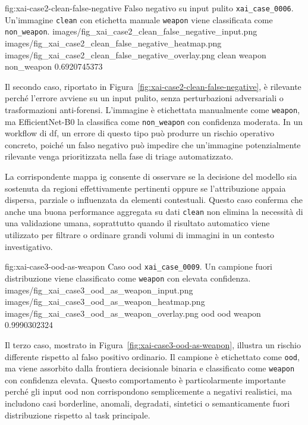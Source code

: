 \XAIcaseFigure
{fig:xai-case2-clean-false-negative}
{Falso negativo su input pulito \texttt{xai\_case\_0006}. Un'immagine \texttt{clean} con etichetta manuale \texttt{weapon} viene classificata come \texttt{non\_weapon}.}
{images/fig_xai_case2_clean_false_negative_input.png}
{images/fig_xai_case2_clean_false_negative_heatmap.png}
{images/fig_xai_case2_clean_false_negative_overlay.png}
{clean}
{weapon}
{non\_weapon}
{0.6920745373}

Il secondo caso, riportato in Figura~\ref{fig:xai-case2-clean-false-negative},
è rilevante perché l'errore avviene su un input pulito, senza perturbazioni
adversariali o trasformazioni anti-forensi. L'immagine è etichettata
manualmente come \texttt{weapon}, ma EfficientNet-B0 la classifica come
\texttt{non\_weapon} con confidenza moderata. In un workflow di \gls{df}, un
errore di questo tipo può produrre un rischio operativo concreto, poiché un falso
negativo può impedire che un'immagine potenzialmente rilevante venga
prioritizzata nella fase di triage automatizzato.

La corrispondente mappa \gls{ig} consente di osservare se la decisione del
modello sia sostenuta da regioni effettivamente pertinenti oppure se
l'attribuzione appaia dispersa, parziale o influenzata da elementi contestuali.
Questo caso conferma che anche una buona performance aggregata su dati
\texttt{clean} non elimina la necessità di una validazione umana, soprattutto
quando il risultato automatico viene utilizzato per filtrare o ordinare grandi
volumi di immagini in un contesto investigativo.

\XAIcaseFigure
{fig:xai-case3-ood-as-weapon}
{Caso \gls{ood} \texttt{xai\_case\_0009}. Un campione fuori distribuzione viene classificato come \texttt{weapon} con elevata confidenza.}
{images/fig_xai_case3_ood_as_weapon_input.png}
{images/fig_xai_case3_ood_as_weapon_heatmap.png}
{images/fig_xai_case3_ood_as_weapon_overlay.png}
{ood}
{ood}
{weapon}
{0.9990302324}

Il terzo caso, mostrato in Figura~\ref{fig:xai-case3-ood-as-weapon}, illustra
un rischio differente rispetto al falso positivo ordinario. Il campione è
etichettato come \texttt{ood}, ma viene assorbito dalla frontiera decisionale
binaria e classificato come \texttt{weapon} con confidenza elevata. Questo
comportamento è particolarmente importante perché gli input \gls{ood} non
corrispondono semplicemente a negativi realistici, ma includono casi borderline,
anomali, degradati, sintetici o semanticamente fuori distribuzione rispetto al
task principale.

